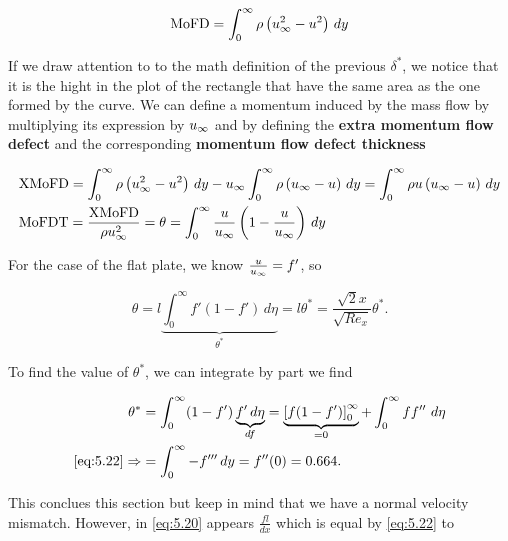 			\begin{equation}
				\mbox{MoFD} = \int_0^\infty \rho \left(  \uinf ^2 - u^2 \right) \, dy
			\end{equation}
		
			If we draw attention to to the math definition of the previous $\delta ^*$, we notice that it is the hight in the plot of the rectangle that have the same area as the one formed by the curve. We can define a momentum induced by the mass flow by multiplying its expression by $\uinf$ and by defining the \textbf{extra momentum flow defect} and the corresponding \textbf{momentum flow defect thickness}
			
			\begin{equation}
			\begin{aligned}
				&\mbox{XMoFD} =  \int_0^\infty \rho \left(  \uinf ^2 - u^2 \right) \, dy - \uinf \int_0^\infty \rho \left( \uinf -u \right)\, dy 
= \int_0^\infty \rho u \left(\uinf - u\right) \,  dy\\
				&\mbox{MoFDT} = \frac{\mbox{XMoFD}}{\rho \uinf ^2} = \theta = \int_0^\infty \frac{ u}{\uinf} \left( 1 - \frac{u}{\uinf} \right)\, dy
			\end{aligned}
			\end{equation}
			
			For the case of the flat plate, we know $\frac{u}{\uinf} = f'$, so
			
			\begin{equation}
				\theta = l \underbrace{\int _0^\infty f' (1-f') \, d\eta}_{\theta ^*} = l\theta ^* = \frac{\sqrt{2}x}{\sqrt{Re_x}} \theta ^*.
			\end{equation}
			
			To find the value of $\theta ^*$, we can integrate by part we find
			
			\begin{equation}
			\begin{aligned}
				\theta ^* &= \int _0^\infty (1-f') \underbrace{f' \, d\eta}_{df} = \underbrace{\left[ f (1-f') \right]_0^\infty}_{=0} + \int_0^\infty f f'' \ d\eta\\
				\eqref{eq:5.22} \Rightarrow &= \int_0^\infty - f''' \, dy = f''(0) = 0.664.
			\end{aligned}
			\end{equation}
			
			This conclues this section but keep in mind that we have a normal velocity mismatch. However, in \eqref{eq:5.20} appears $\frac{fl}{dx}$ which is equal by \eqref{eq:5.22} to 
			
